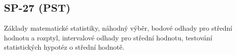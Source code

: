 \subsection{SP-27 (PST)}
Základy matematické statistiky, náhodný výběr, bodové odhady pro střední hodnotu a rozptyl, intervalové odhady pro střední hodnotu, testování statistických hypotéz o střední hodnotě.